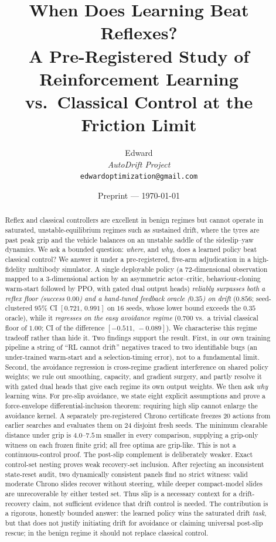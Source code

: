 \documentclass[11pt]{article}
\title{\textbf{When Does Learning Beat Reflexes?\\
A Pre-Registered Study of Reinforcement Learning vs.\ Classical Control at the Friction Limit}}
\author{Edward \\ \textit{AutoDrift Project} \\ \texttt{edwardoptimization@gmail.com}}
\date{Preprint --- \today}
\begin{document}
\maketitle

\begin{abstract}
Reflex and classical controllers are excellent in benign regimes but cannot operate in
saturated, unstable-equilibrium regimes such as sustained drift, where the tyres are past peak
grip and the vehicle balances on an unstable saddle of the sideslip--yaw dynamics. We ask a
bounded question: \emph{where}, and \emph{why}, does a learned policy beat classical control?
We answer it under a pre-registered, five-arm adjudication in a high-fidelity multibody simulator.
A single deployable policy (a 72-dimensional observation mapped to a 3-dimensional action by an
asymmetric actor--critic, behaviour-cloning warm-start followed by PPO, with gated dual output
heads) \emph{reliably surpasses both a reflex floor (success $0.00$) and a hand-tuned feedback
oracle ($0.35$) on drift} ($0.856$; seed-clustered $95\%$ CI $[0.721,\,0.991]$ on $16$ seeds, whose
lower bound exceeds the $0.35$ oracle), while it \emph{regresses on the easy avoidance regime}
($0.700$ vs.\ a trivial classical floor of $1.00$; CI of the difference $[-0.511,\,-0.089]$). We
characterise this regime tradeoff rather than hide it. Two findings support the result. First, in
our own training pipeline a string of ``RL cannot drift'' negatives traced to two identifiable
bugs (an under-trained warm-start and a selection-timing error), not to a fundamental limit.
Second, the avoidance regression is cross-regime gradient interference on shared policy weights; we
rule out smoothing, capacity, and gradient surgery, and partly resolve it with gated dual heads
that give each regime its own output weights. We then ask \emph{why} learning wins. For pre-slip
avoidance, we state eight explicit assumptions and prove a force-envelope differential-inclusion
theorem: requiring high slip cannot enlarge the avoidance kernel. A separately pre-registered
Chrono certificate freezes 20 actions from earlier searches and evaluates them on 24 disjoint fresh
seeds. The minimum clearable distance under grip is $4.0$--$7.5$\,m smaller in every comparison,
supplying a grip-only witness on each frozen finite grid; all free optima are grip-like. This is not a
continuous-control proof. The post-slip complement is deliberately weaker. Exact control-set nesting
proves weak recovery-set inclusion. After rejecting an inconsistent state-reset audit, two
dynamically consistent panels find no strict witness: valid moderate Chrono slides recover without
steering, while deeper compact-model slides are unrecoverable by either tested set. Thus slip is a
necessary context for a drift-recovery claim, not sufficient evidence that drift control is needed.
The contribution is a rigorous, honestly bounded answer: the learned policy wins the saturated drift
\emph{task}, but that does not justify initiating drift for avoidance or claiming universal post-slip
rescue; in the benign regime it should not replace classical control.
\end{abstract}
\end{document}
